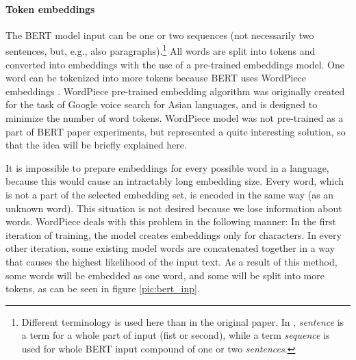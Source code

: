 \paragraph{Token embeddings}
The BERT model input can be one or two sequences (not necessarily two sentences, but, e.g., also paragraphs).\footnote{Different terminology is used here than in the original paper. In \citep{Devlin2019}, \textit{sentence} is a term for a whole part of input (fist or second), while a term \textit{sequence} is used for whole BERT input compound of one or two \textit{sentences}.} All words are split into tokens and converted into embeddings with the use of a pre-trained embeddings model. One word can be tokenized into more tokens because BERT uses WordPiece
embeddings \citep{Wu2016}. WordPiece pre-trained embedding algorithm was originally created for the task of Google voice search for Asian languages, and is designed to minimize the number of word tokens. WordPiece model was not pre-trained as a part of BERT paper experiments, but represented a quite interesting solution, so that the idea will be briefly explained here.
\par
It is impossible to prepare embeddings for every possible word in a language, because this would cause an intractably long embedding size. %
Every word, which is not a part of the selected embedding set, is encoded in the same way (as an unknown word). This situation is not desired because we lose information about words. WordPiece deals with this problem in the following manner: In the first iteration of training, the model creates embeddings only for characters. In every other iteration, some existing model words are concatenated together in a way that causes the highest likelihood of the input text. As a result of this method, some words will be embedded as one word, and some will be split into more tokens, as can be seen in figure \ref{pic:bert_inp}.


